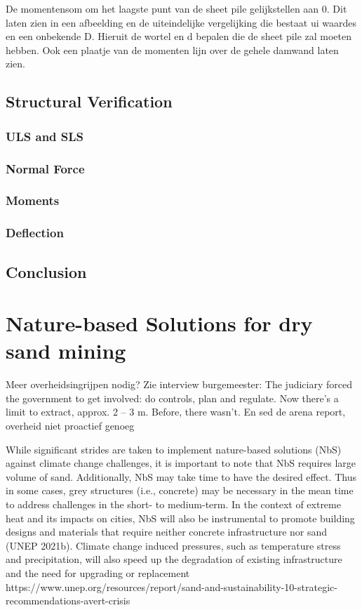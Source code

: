 De momentensom om het laagste punt van de sheet pile gelijkstellen aan 0. Dit laten zien in een afbeelding en de uiteindelijke vergelijking die bestaat ui waardes en een onbekende D. Hieruit de wortel en d bepalen die de sheet pile zal moeten hebben. Ook een plaatje van de momenten lijn over de gehele damwand laten zien.

\subsection{Structural Verification}

\subsubsection{ULS and SLS}

\subsubsection{Normal Force}

\subsubsection{Moments}

\subsubsection{Deflection}

\subsection{Conclusion}

\section{Nature-based Solutions for dry sand mining}
Meer overheidsingrijpen nodig? Zie interview burgemeester: The judiciary forced the government to get involved: do controls, plan and regulate. Now there’s
a limit to extract, approx. 2 – 3 m. Before, there wasn’t.
En sed de arena report, overheid niet proactief genoeg


While significant strides are taken to implement
nature-based solutions (NbS) against climate change
challenges, it is important to note that NbS requires large
volume of sand. Additionally, NbS may take time to have
the desired effect. Thus in some cases, grey structures
(i.e., concrete) may be necessary in the mean time to
address challenges in the short- to medium-term. In the
context of extreme heat and its impacts on cities, NbS
will also be instrumental to promote building designs and
materials that require neither concrete infrastructure nor
sand (UNEP 2021b). Climate change induced pressures,
such as temperature stress and precipitation, will also
speed up the degradation of existing infrastructure and
the need for upgrading or replacement
https://www.unep.org/resources/report/sand-and-sustainability-10-strategic-recommendations-avert-crisis

